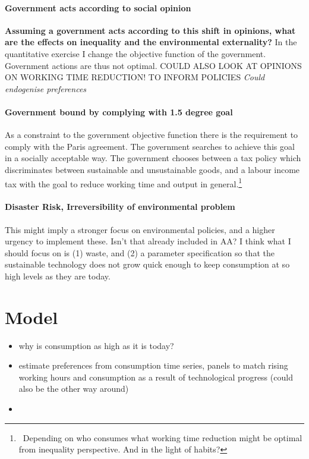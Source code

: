 \documentclass[12pt]{article}
\begin{document}
\paragraph{Government acts according to social opinion}
\textbf{Assuming a government acts according to this shift in opinions, what are the effects on inequality and the environmental externality?}
In the quantitative exercise I change the objective function of the government. Government actions are thus not optimal. COULD ALSO LOOK AT OPINIONS ON WORKING TIME REDUCTION! TO INFORM POLICIES
\textit{Could endogenise preferences}

\paragraph{Government bound by complying with 1.5 degree goal}
As a constraint to the government objective function there is the requirement to comply with the Paris agreement. The government searches to achieve this goal in a socially acceptable way. The government chooses between a tax policy which discriminates between sustainable and unsustainable goods, and a labour income tax with the goal to reduce working time and output in general.\footnote{\ Depending on who consumes what working time reduction might be optimal from inequality perspective. And in the light of habits?}

\paragraph{Disaster Risk, Irreversibility of environmental problem}
This might imply a stronger focus on environmental policies, and a higher urgency to implement these. Isn't that already included in AA? I think what I should focus on is (1) waste, and (2) a parameter specification so that the sustainable technology does not grow quick enough to keep consumption at so high levels as they are today.

\section{Model}
\begin{itemize}
\item why is consumption as high as it is today?
\item estimate preferences from consumption time series, panels to match rising working hours and consumption as a result of technological progress (could also be the other way around)
\item 
\end{itemize}
\end{document}
